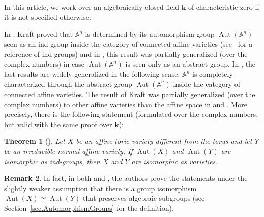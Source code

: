\documentclass[11pt]{article}
\makeatletter
\numberwithin{equation}{section}
\theoremstyle{plain}
\newtheorem{introtheorem}{Theorem}
\theoremstyle{definition}
\newtheorem{introremark}[introtheorem]{Remark}
\DeclareMathOperator{\Aut}{Aut}
\renewcommand{\AA}{\mathbb{A}}
\newcommand{\kk}{{\boldsymbol{k}}}
\newcommand{\name}[1]{#1}
\renewcommand\section{\@startsection{section}{1}{\z@}{-3.5ex \@plus -1ex \@minus -.2ex}{2.3ex \@plus .2ex}{\normalfont\large\bfseries}}
\makeatother
\begin{document}
\section{Introduction}

In this article, we work over an algebraically closed field $\kk$ of characteristic zero
if it is not specified
otherwise.

In \cite[Th.\,1.1]{Kraft2017}, \name{Kraft} proved
that $\mathbb{A}^n$ is determined by
its automorphism group $\Aut(\AA^n)$ seen as an ind-group
inside the category of connected affine varieties
(see~\cite{FuKr2018On-the-geometry-of} for a reference of ind-groups) and in \cite[Main Th.]{KrReSa2018Is-the-affine-spac},
this result was partially generalized (over the complex numbers)
in case $\Aut(\AA^n)$ is seen only as an abstract group.
In \cite[Th.\,A]{CaReXi2019Families-of-Commut},
the last results are widely generalized in the following sense:
$\AA^n$ is completely characterized through the abstract group
$\Aut(\AA^n)$ inside the category of connected affine varieties.
The result of \name{Kraft} was partially generalized (over the complex numbers) to other affine varieties
than the affine space in \cite{Re2017Characterization-o} and \cite{LiReUr2018Characterization-o}.
More precisely, there is the following statement
(formulated over the complex numbers, but valid with the same proof over $\kk$):

\begin{introtheorem}[{\cite[Th.\,1.4]{LiReUr2018Characterization-o}}]
\label{theorem0}
Let $X$ be an affine toric variety different from the torus
and let $Y$ be an irreducible normal affine variety. If $\Aut(X)$ and $\Aut(Y)$ are isomorphic
as ind-groups, then $X$ and $Y$ are isomorphic as varieties.
\end{introtheorem}

\begin{introremark}
\label{rem.Theorem0}
In fact, in both \cite{Kraft2017} and \cite[Th.\,1.4]{LiReUr2018Characterization-o}, the
authors prove the statements under the slightly weaker assumption
that there is a group isomorphism $\Aut(X) \simeq \Aut(Y)$
that preserves algebraic subgroups (see Section~\ref{sec.AutomorphismGroups} for the definition).
\end{introremark}
\end{document}
